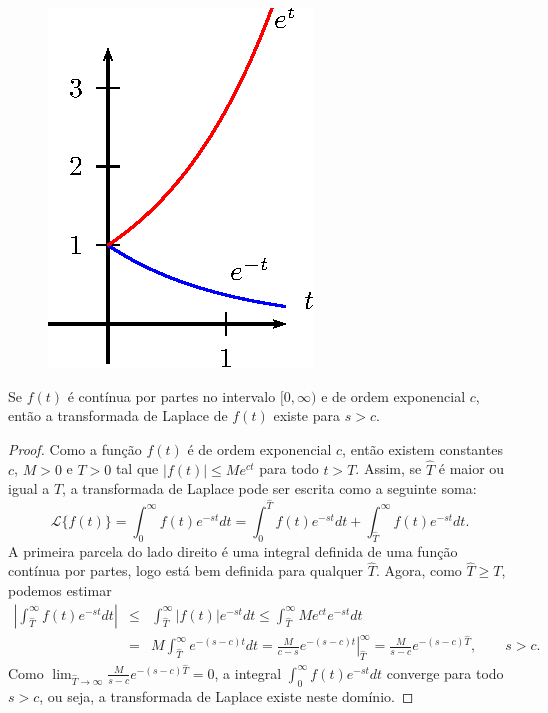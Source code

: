 \begin{ex}
\begin{figure}[!ht]
\begin{center}
\includegraphics{cap_definicao/pics/figura_3}\end{center}
\caption{\label{ordem_exp}}
\end{figure}
\end{ex}
\begin{teo}\label{ordem_exp_exist} Se $f(t)$ é contínua por partes no intervalo $[0,\infty)$ e de ordem exponencial $c$, então a transformada de Laplace de $f(t)$ existe para $s>c$.
\end{teo}
\begin{proof}Como a função $f(t)$ é de ordem exponencial $c$, então existem constantes $c$, $M>0$ e $T>0$ tal que $|f(t)|\leq M e^{ct}$ para todo $t>T$. Assim, se $\hat{T}$ é maior ou igual a $T$, a transformada de Laplace  pode ser escrita como a seguinte soma:
$$
\mathcal{L}\{f(t)\}=\int_0^\infty f(t)e^{-st}dt=\int_0^{\hat{T}} f(t)e^{-st}dt+\int_{\hat{T}}^\infty f(t)e^{-st}dt.
$$
A primeira parcela do lado direito é uma integral definida de uma função contínua por partes, logo está bem definida para qualquer $\hat{T}$.
Agora, como $\hat{T}\geq T$, podemos estimar
\begin{eqnarray*}
\left|\int_{\hat{T}}^\infty f(t)e^{-st}dt\right|&\leq& \int_{\hat{T}}^\infty \left|f(t)\right|e^{-st}dt\leq \int_{\hat{T}}^\infty M e^{ct}e^{-st}dt\\
&=&M \int_{\hat{T}}^\infty e^{-(s-c)t}dt
=\left.\frac{M}{c-s} e^{-(s-c)t}\right|_{\hat{T}}^\infty =\frac{M}{s-c}e^{-(s-c)\hat{T}} ,\qquad s>c.
\end{eqnarray*}
Como $\lim_{\hat{T}\to \infty} \frac{M}{s-c}e^{-(s-c)\hat{T}}=0$, a integral $\int_0^\infty f(t)e^{-st}dt$ converge para todo $s>c$, ou seja, a transformada de Laplace existe neste domínio.
\end{proof}
